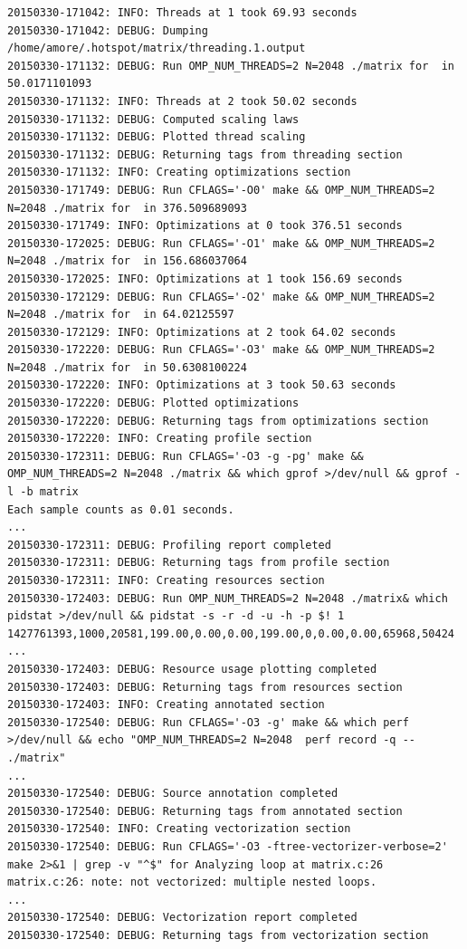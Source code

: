 \documentclass[a4paper]{report}
\begin{document}
\begin{lstlisting}[caption={Salida de Ejemplo},basicstyle=\tiny,label={lst:log}]
20150330-171042: INFO: Threads at 1 took 69.93 seconds
20150330-171042: DEBUG: Dumping /home/amore/.hotspot/matrix/threading.1.output
20150330-171132: DEBUG: Run OMP_NUM_THREADS=2 N=2048 ./matrix for  in 50.0171101093
20150330-171132: INFO: Threads at 2 took 50.02 seconds
20150330-171132: DEBUG: Computed scaling laws
20150330-171132: DEBUG: Plotted thread scaling
20150330-171132: DEBUG: Returning tags from threading section
20150330-171132: INFO: Creating optimizations section
20150330-171749: DEBUG: Run CFLAGS='-O0' make && OMP_NUM_THREADS=2 N=2048 ./matrix for  in 376.509689093
20150330-171749: INFO: Optimizations at 0 took 376.51 seconds
20150330-172025: DEBUG: Run CFLAGS='-O1' make && OMP_NUM_THREADS=2 N=2048 ./matrix for  in 156.686037064
20150330-172025: INFO: Optimizations at 1 took 156.69 seconds
20150330-172129: DEBUG: Run CFLAGS='-O2' make && OMP_NUM_THREADS=2 N=2048 ./matrix for  in 64.02125597
20150330-172129: INFO: Optimizations at 2 took 64.02 seconds
20150330-172220: DEBUG: Run CFLAGS='-O3' make && OMP_NUM_THREADS=2 N=2048 ./matrix for  in 50.6308100224
20150330-172220: INFO: Optimizations at 3 took 50.63 seconds
20150330-172220: DEBUG: Plotted optimizations
20150330-172220: DEBUG: Returning tags from optimizations section
20150330-172220: INFO: Creating profile section
20150330-172311: DEBUG: Run CFLAGS='-O3 -g -pg' make && OMP_NUM_THREADS=2 N=2048 ./matrix && which gprof >/dev/null && gprof -l -b matrix
Each sample counts as 0.01 seconds.
...
20150330-172311: DEBUG: Profiling report completed
20150330-172311: DEBUG: Returning tags from profile section
20150330-172311: INFO: Creating resources section
20150330-172403: DEBUG: Run OMP_NUM_THREADS=2 N=2048 ./matrix& which pidstat >/dev/null && pidstat -s -r -d -u -h -p $! 1
1427761393,1000,20581,199.00,0.00,0.00,199.00,0,0.00,0.00,65968,50424
...
20150330-172403: DEBUG: Resource usage plotting completed
20150330-172403: DEBUG: Returning tags from resources section
20150330-172403: INFO: Creating annotated section
20150330-172540: DEBUG: Run CFLAGS='-O3 -g' make && which perf >/dev/null && echo "OMP_NUM_THREADS=2 N=2048  perf record -q -- ./matrix"
...
20150330-172540: DEBUG: Source annotation completed
20150330-172540: DEBUG: Returning tags from annotated section
20150330-172540: INFO: Creating vectorization section
20150330-172540: DEBUG: Run CFLAGS='-O3 -ftree-vectorizer-verbose=2' make 2>&1 | grep -v "^$" for Analyzing loop at matrix.c:26
matrix.c:26: note: not vectorized: multiple nested loops.
...
20150330-172540: DEBUG: Vectorization report completed
20150330-172540: DEBUG: Returning tags from vectorization section

\end{lstlisting}
\end{document}
